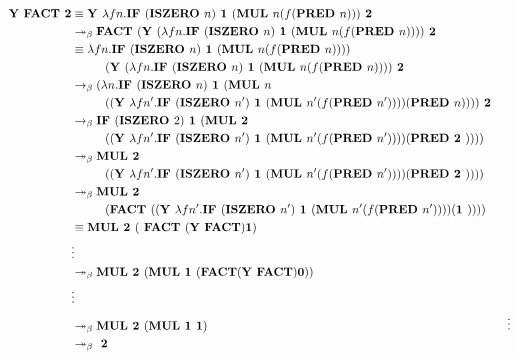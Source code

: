 \begin{esim}
\begin{align*}
\textbf{Y FACT 2} &\equiv \textbf{Y }\lambda f n. \textbf{IF } (\textbf{ISZERO } n) \textbf{ 1 } (\textbf{MUL } n  (f (\textbf{PRED } n))) \textbf{ 2} \\
&\twoheadrightarrow_{\beta} \textbf{FACT }( \textbf{Y } (\lambda f n. \textbf{IF } (\textbf{ISZERO } n ) \textbf{ 1 } (\textbf{MUL } n (f (\textbf{PRED } n))) ) \textbf{ 2} \\
&\equiv \lambda f n. \textbf{IF } (\textbf{ISZERO } n) \textbf{ 1 } (\textbf{MUL } n  (f (\textbf{PRED } n))) ) \\
	& \hspace{10 mm} ( \textbf{Y } (\lambda f n. \textbf{IF } (\textbf{ISZERO } n ) \textbf{ 1 } (\textbf{MUL } n (f (\textbf{PRED } 	n))) ) \textbf{ 2 }\\
&\rightarrow_{\beta} (\lambda n. \textbf{IF } (\textbf{ISZERO } n) \textbf{ 1 } (\textbf{MUL } n \\
	& \hspace{10 mm} (( \textbf{Y }\lambda f n'. \textbf{IF } (\textbf{ISZERO } n' ) \textbf{ 1 } (\textbf{MUL } n' (f (\textbf{PRED  	} n'))) )  (\textbf{PRED } n))) ) \textbf{ 2 }\\
&\rightarrow_{\beta} \textbf{IF } (\textbf{ISZERO } 2) \textbf{ 1 } (\textbf{MUL 2 } \\
	& \hspace{10 mm} (( \textbf{Y }\lambda f n'. \textbf{IF } (\textbf{ISZERO } n' ) \textbf{ 1 } (\textbf{MUL } n'(f (\textbf{PRED  	} n'))) )  (\textbf{PRED 2 } ))) ) \\
&\twoheadrightarrow_{\beta} \textbf{MUL 2 } \\
	& \hspace{10 mm} (( \textbf{Y }\lambda f n'. \textbf{IF } (\textbf{ISZERO } n' ) \textbf{ 1 } (\textbf{MUL } n' (f (\textbf{PRED  	} n'))) )  (\textbf{PRED 2 }))) )	\\
&\twoheadrightarrow_{\beta} \textbf{MUL 2 } \\
	& \hspace{10 mm} (\textbf{FACT } (( \textbf{Y }\lambda f n'. \textbf{IF } (\textbf{ISZERO } n' ) \textbf{ 1 } (\textbf{MUL } n' (f (\textbf{PRED } n'))) )  (\textbf{1 } ))) ) \\
& \equiv \textbf{MUL 2 } (\textbf{ FACT } ( \textbf{Y FACT} )  \textbf{1}) \\
&\vdots \\
& \twoheadrightarrow_{\beta} \textbf{MUL 2 } (\textbf{MUL 1 } ( \textbf{FACT} (\textbf{Y FACT}) \textbf{0} ) ) \\
&\vdots \\
& \twoheadrightarrow_{\beta} \textbf{MUL 2 } (\textbf{MUL 1 } \textbf{1} )
&\vdots \\
& \twoheadrightarrow_{\beta} \textbf{ 2 }
\end{align*}
\end{esim}
\par


